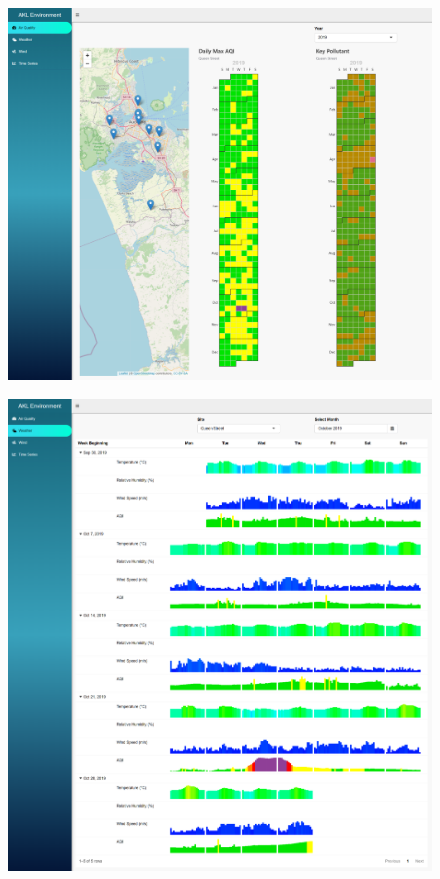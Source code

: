 \documentclass{aucklandthesis}
\begin{document}
\begin{figure}
\includegraphics[width=1\linewidth]{figures/aqi-tab} \end{figure}
\begin{figure}
\includegraphics[width=1\linewidth]{figures/met-tab} \end{figure}
\end{document}
